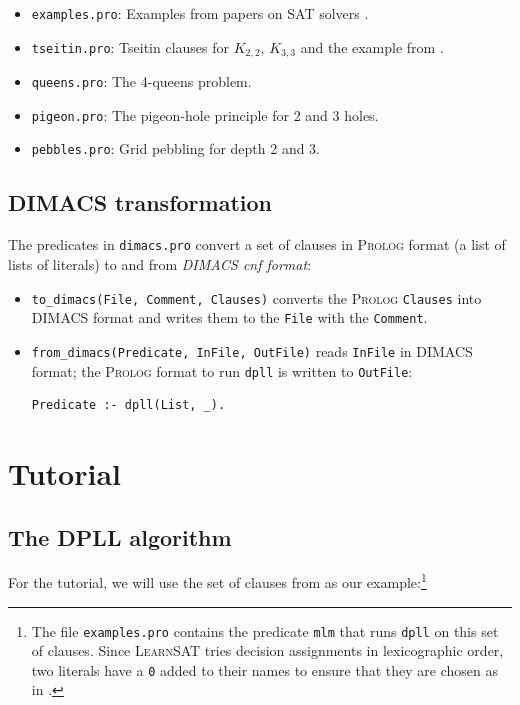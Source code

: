 \documentclass[11pt]{report}
\newcommand*{\p}[1]{\textup{\texttt{#1}}}
\newcommand*{\ls}{\textsc{LearnSAT}}
\newcommand*{\pl}{\textsc{Prolog}}
\begin{document}
\begin{itemize}
\item \p{examples.pro}: Examples from papers on SAT
solvers \cite{mz,mlm,ms}.

\item \p{tseitin.pro}: Tseitin clauses for $K_{2,2}$,
$K_{3,3}$ and the example from \cite[Section 4.5]{mlcs}.

\item \p{queens.pro}: The 4-queens problem.

\item \p{pigeon.pro}: The pigeon-hole principle for 2 and 3 holes.

\item \p{pebbles.pro}: Grid pebbling for depth 2 and 3.
\end{itemize}


\section{DIMACS transformation}

The predicates in \p{dimacs.pro} convert a set of clauses in
\pl{} format (a list of lists of literals) to and from \emph{DIMACS cnf
format}:
\begin{itemize}
\item \p{to\_dimacs(File, Comment, Clauses)} converts the \pl{}
\p{Clauses} into DIMACS format and writes them to the \p{File} with the
\p{Comment}.
\item \p{from\_dimacs(Predicate, InFile, OutFile)} reads \p{InFile} in
DIMACS format; the \pl{} format to run \p{dpll} is written to
\p{OutFile}:
\begin{verbatim}
Predicate :- dpll(List, _).
\end{verbatim}
\end{itemize}


\chapter{Tutorial}

\section{The DPLL algorithm}

For the tutorial, we will use the set of clauses from \cite{mlm} as our
example:\footnote{The file \p{examples.pro} contains the predicate
\p{mlm} that runs \p{dpll} on this set of clauses. Since \ls{} tries
decision assignments in lexicographic order, two literals have a \p{0}
added to their names to ensure that they are chosen as in \cite{mlm}.}
\end{document}

